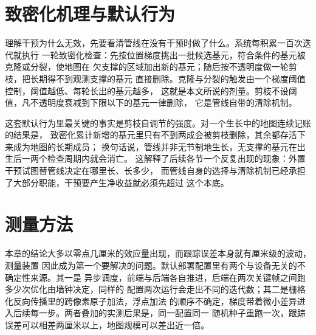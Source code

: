 \section{致密化机理与默认行为}
\label{sec:study3-mechanism}

理解干预为什么无效，先要看清管线在没有干预时做了什么。系统每积累一百次迭代就执行
一轮致密化检查：先按位置梯度挑出一批候选基元，符合条件的基元被克隆或分裂，使地图在
欠支撑的区域加出新的基元；随后按不透明度做一轮剪枝，把长期得不到观测支撑的基元
直接删除。克隆与分裂的触发由一个梯度阈值控制，阈值越低、每轮长出的基元越多，
这就是本文所说的剂量。剪枝不设阈值，凡不透明度衰减到下限以下的基元一律删除，
它是管线自带的清除机制。

这套默认行为里最关键的事实是剪枝自调节的强度。对一个生长中的地图连续记账的结果是，
致密化累计新增的基元里只有不到两成会被剪枝删除，其余都存活下来成为地图的长期成员；
换句话说，管线并非无节制地生长，无支撑的基元在出生后一两个检查周期内就会消亡。
这解释了后续各节一个反复出现的现象：外置干预试图替管线决定在哪里长、长多少，
而管线自身的选择与清除机制已经承担了大部分职能，干预要产生净收益就必须先超过
这个本底。

\section{测量方法}
\label{sec:study3-instrument}

本章的结论大多以零点几厘米的效应量出现，而跟踪误差本身就有厘米级的波动，测量装置
因此成为第一个要解决的问题。默认部署配置里有两个与设备无关的不确定性来源。其一是
异步调度，前端与后端各自推进，后端在两次关键帧之间跑多少次优化由墙钟决定，同样的
配置两次运行会走出不同的迭代数；其二是栅格化反向传播里的跨像素原子加法，浮点加法
的顺序不确定，梯度带着微小差异进入后续每一步。两者叠加的实测后果是，同一配置同一
随机种子重跑一次，跟踪误差可以相差两厘米以上，地图规模可以差出近一倍。

